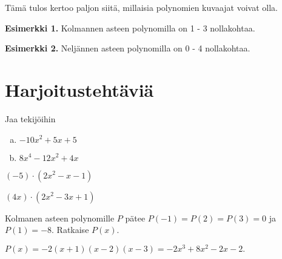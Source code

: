 Tämä tulos kertoo paljon siitä, millaisia polynomien kuvaajat voivat olla. 

\textbf{Esimerkki 1.} Kolmannen asteen polynomilla on 1 - 3 nollakohtaa.

\begin{lukusuora}{-2.5}{3}{3}
\end{lukusuora}
\begin{lukusuora}{-2.8}{2.5}{3}
\end{lukusuora}
\begin{lukusuora}{-2}{2}{3}
\end{lukusuora}

\textbf{Esimerkki 2.} Neljännen asteen polynomilla on 0 - 4 nollakohtaa.

\begin{lukusuora}{-4}{4}{3}
\end{lukusuora}
\begin{lukusuora}{-4}{4}{3}
\end{lukusuora}
\begin{lukusuora}{-4}{4}{3}
\end{lukusuora}

\begin{lukusuora}{-4}{4}{3}
\end{lukusuora}
\begin{lukusuora}{-2.8}{2.8}{3}
\end{lukusuora}

\section{Harjoitustehtäviä}

\begin{tehtava}
  Jaa tekijöihin
  \begin{enumerate}[a)]
    \item $-10x^2+5x+5$
    \item $8x^4-12x^2+4x$
  \end{enumerate}

  \begin{vastaus}
    \item $(-5)\cdot(2x^2-x-1)$
    \item $(4x)\cdot(2x^2-3x+1)$
  \end{vastaus}
\end{tehtava}

\begin{tehtava}
  Kolmanen asteen polynomille $P$ pätee $P(-1)=P(2)=P(3)=0$ ja $P(1)=-8$. Ratkaise $P(x)$.

  \begin{vastaus}
    $P(x)=-2(x+1)(x-2)(x-3)=-2x^3+8x^2-2x-2.$
  \end{vastaus}
\end{tehtava}
